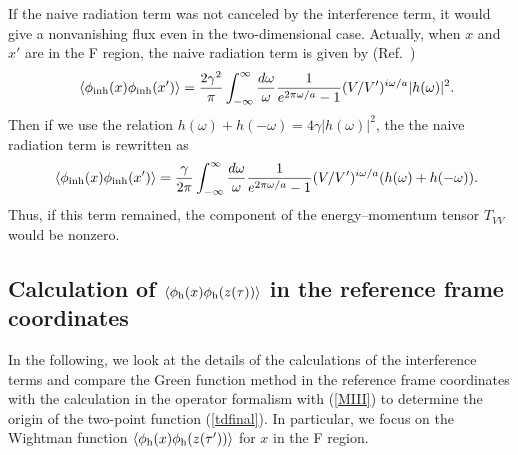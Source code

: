 \documentclass[aps,prd,preprintnumbers,nofootinbib,showpacs]{revtex4}%
\begin{document}
\begin{widetext}
If the naive radiation term was not canceled by the interference term,
it would give a nonvanishing flux even in the two-dimensional case. 
Actually, when $x$ and $x'$ are in the F region, the naive radiation term is given by 
(Ref.~\cite{HuRaval})
\begin{eqnarray}
&&\langle\phi_{\rm inh}(x)\phi_{\rm inh}(x')\rangle
={2\gamma^2\over \pi}\int_{-\infty}^{\infty}{d\omega\over \omega}{1\over e^{2\pi\omega/a}-1}
(V/V')^{i\omega/a}|h(\omega)|^2.
\end{eqnarray}
Then if we use the relation $h(\omega)+h(-\omega)=4\gamma|h(\omega)|^2$, the 
the naive radiation term is rewritten as
\begin{eqnarray}
&&\langle\phi_{\rm inh}(x)\phi_{\rm inh}(x')\rangle
={\gamma\over 2\pi}\int_{-\infty}^{\infty}{d\omega\over \omega}{1\over e^{2\pi\omega/a}-1}
(V/V')^{i\omega/a}(h(\omega)+h(-\omega)).
\label{pxpxvv}
\end{eqnarray}
Thus, if this term remained, the component of the energy--momentum tensor $T_{VV}$ would be
nonzero. 
\subsection{Calculation of $\langle\phi_{\rm h}(x)\phi_{\rm h}(z(\tau))\rangle$ 
in the reference frame coordinates
\label{Sec:2dimGreen}}
In the following, we look at the details of the calculations of the interference terms
and compare the Green function method in the reference frame coordinates 
with the calculation in the operator formalism with (\ref{MIII}) 
to determine the origin of the two-point function (\ref{tdfinal}). 
In particular, we focus on the Wightman function $\langle \phi_{\rm h}(x)\phi_{\rm h}(z(\tau'))\rangle$
for $x$ in the F region. 


\end{widetext}
\end{document}
